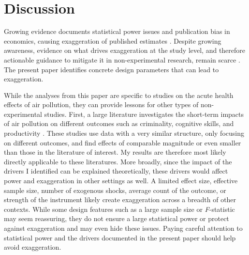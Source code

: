 \documentclass[12pt]{article}
\begin{document}



\section{Discussion}\label{section_discussion}

	Growing evidence documents statistical power issues and publication bias in economics, causing exaggeration of published estimates \citep{brodeur_star_2016, ioannidis_power_2017, brodeur_methods_2020, ferraro_feature_2020}. Despite growing awareness, evidence on what drives exaggeration at the study level, and therefore actionable guidance to mitigate it in non-experimental research, remain scarce \citep{altoe_enhancing_2020, black_simulated_2022}. The present paper identifies concrete design parameters that can lead to exaggeration.
	
	While the analyses from this paper are specific to studies on the acute health effects of air pollution, they can provide lessons for other types of non-experimental studies. First, a large literature investigates the short-term impacts of air pollution on different outcomes such as criminality, cognitive skills, and productivity \citep[for instance]{herrnstadt_air_2021, ebenstein_long-run_2016, adhvaryu2022management}. These studies use data with a very similar structure, only focusing on different outcomes, and find effects of comparable magnitude or even smaller than those in the literature of interest. My results are therefore most likely directly applicable to these literatures. More broadly, since the impact of the drivers I identified can be explained theoretically, these drivers would affect power and exaggeration in other settings as well. A limited effect size, effective sample size, number of exogenous shocks, average count of the outcome, or strength of the instrument likely create exaggeration across a breadth of other contexts. While some design features such as a large sample size or \textit{F}-statistic may seem reassuring, they do not ensure a large statistical power or protect against exaggeration and may even hide these issues. Paying careful attention to statistical power and the drivers documented in the present paper should help avoid exaggeration.
	
\end{document}
